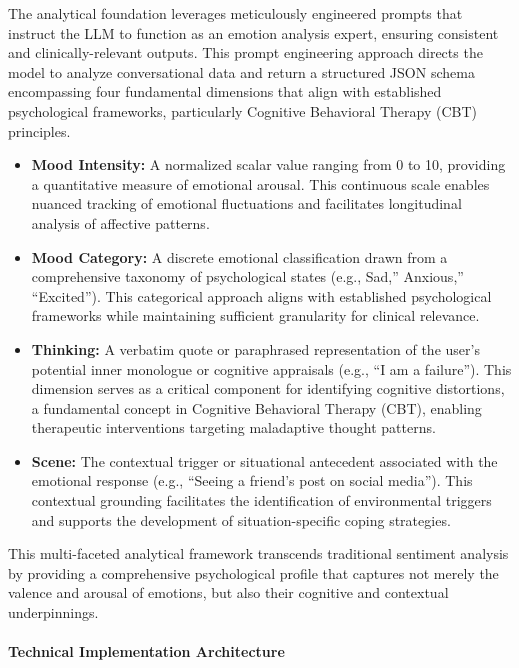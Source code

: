 The analytical foundation leverages meticulously engineered prompts that instruct the LLM to function as an emotion analysis expert, ensuring consistent and clinically-relevant outputs. This prompt engineering approach directs the model to analyze conversational data and return a structured JSON schema encompassing four fundamental dimensions that align with established psychological frameworks, particularly Cognitive Behavioral Therapy (CBT) principles.

\begin{itemize}
\item \textbf{Mood Intensity:} A normalized scalar value ranging from 0 to 10, providing a quantitative measure of emotional arousal. This continuous scale enables nuanced tracking of emotional fluctuations and facilitates longitudinal analysis of affective patterns.

\item \textbf{Mood Category:} A discrete emotional classification drawn from a comprehensive taxonomy of psychological states (e.g., Sad,'' Anxious,'' ``Excited''). This categorical approach aligns with established psychological frameworks while maintaining sufficient granularity for clinical relevance.

\item \textbf{Thinking:} A verbatim quote or paraphrased representation of the user's potential inner monologue or cognitive appraisals (e.g., ``I am a failure''). This dimension serves as a critical component for identifying cognitive distortions, a fundamental concept in Cognitive Behavioral Therapy (CBT), enabling therapeutic interventions targeting maladaptive thought patterns.

\item \textbf{Scene:} The contextual trigger or situational antecedent associated with the emotional response (e.g., ``Seeing a friend's post on social media''). This contextual grounding facilitates the identification of environmental triggers and supports the development of situation-specific coping strategies.
\end{itemize}

This multi-faceted analytical framework transcends traditional sentiment analysis by providing a comprehensive psychological profile that captures not merely the valence and arousal of emotions, but also their cognitive and contextual underpinnings.

\paragraph{Technical Implementation Architecture}

